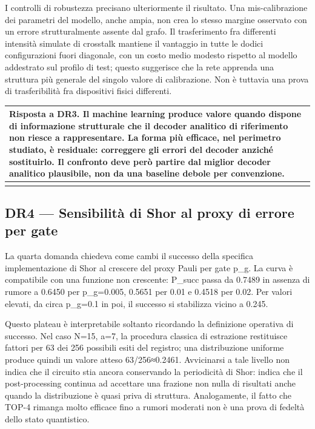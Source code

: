 I controlli di robustezza precisano ulteriormente il risultato. Una mis-calibrazione dei parametri del modello, anche ampia, non crea lo stesso margine osservato con un errore strutturalmente assente dal grafo. Il trasferimento fra differenti intensità simulate di crosstalk mantiene il vantaggio in tutte le dodici configurazioni fuori diagonale, con un costo medio modesto rispetto al modello addestrato sul profilo di test; questo suggerisce che la rete apprenda una struttura più generale del singolo valore di calibrazione. Non è tuttavia una prova di trasferibilità fra dispositivi fisici differenti.

{\def\LTcaptype{none} %
\begin{longtable}[]{@{}
  >{\raggedright\arraybackslash}p{}@{}}
\toprule\noalign{}
\begin{minipage}[b]{\linewidth}\raggedright
\textbf{Risposta a DR3.} Il machine learning produce valore quando dispone di informazione strutturale che il decoder analitico di riferimento non riesce a rappresentare. La forma più efficace, nel perimetro studiato, è residuale: correggere gli errori del decoder anziché sostituirlo. Il confronto deve però partire dal miglior decoder analitico plausibile, non da una baseline debole per convenzione.
\end{minipage} \\
\midrule\noalign{}
\endhead
\bottomrule\noalign{}
\endlastfoot
\end{longtable}
}

\subsection{DR4 --- Sensibilità di Shor al proxy di errore per gate}\label{sec:finale_6_1_4}

La quarta domanda chiedeva come cambi il successo della specifica implementazione di Shor al crescere del proxy Pauli per gate p\_g. La curva è compatibile con una funzione non crescente: P\_succ passa da 0.7489 in assenza di rumore a 0.6450 per p\_g=0.005, 0.5651 per 0.01 e 0.4518 per 0.02. Per valori elevati, da circa p\_g=0.1 in poi, il successo si stabilizza vicino a 0.245.

Questo plateau è interpretabile soltanto ricordando la definizione operativa di successo. Nel caso N=15, a=7, la procedura classica di estrazione restituisce fattori per 63 dei 256 possibili esiti del registro; una distribuzione uniforme produce quindi un valore atteso 63/256≈0.2461. Avvicinarsi a tale livello non indica che il circuito stia ancora conservando la periodicità di Shor: indica che il post-processing continua ad accettare una frazione non nulla di risultati anche quando la distribuzione è quasi priva di struttura. Analogamente, il fatto che TOP-4 rimanga molto efficace fino a rumori moderati non è una prova di fedeltà dello stato quantistico.

